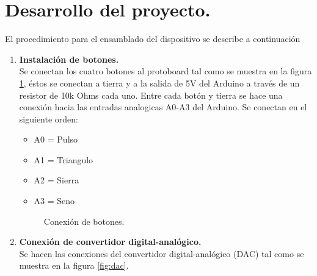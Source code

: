\documentclass[11pt]{article}
\begin{document}
\section{Desarrollo del proyecto.}
El procedimiento para el ensamblado del dispositivo se describe a continuación
\begin{enumerate}[label=\textbf{Paso \arabic*:}]
\item \textbf{Instalación de botones.}\\
Se conectan los cuatro botones al protoboard tal como se muestra en la figura \ref{fig:pushbutton}, éstos se conectan a tierra y a la salida de 5V del Arduino a través de un resistor de 10k Ohms cada uno. Entre cada botón y tierra se hace una conexión hacia las entradas analogicas A0-A3 del Arduino. Se conectan en el  siguiente orden: 
\begin{itemize}
\item A0 = Pulso
\item A1 = Triangulo
\item A2 = Sierra
\item A3 = Seno
\end{itemize}

\begin{figure}[htb]
\centering
{}
\caption{Conexión de botones.}
\label{fig:pushbutton}
\end{figure}

\item \textbf{Conexión de convertidor digital-analógico.}\\
Se hacen las conexiones del convertidor digital-analógico (DAC) tal como se muestra en la figura \ref{fig:dac}.


\end{enumerate}
\end{document}
